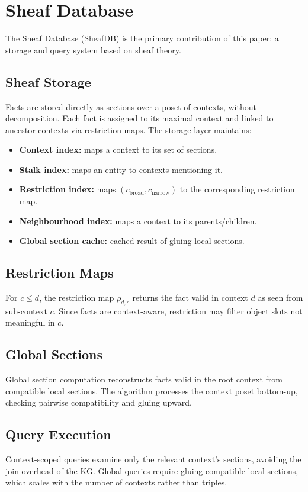 \section{Sheaf Database}
\label{sec:sheaf-database}

The Sheaf Database (SheafDB) is the primary contribution of this paper:
a storage and query system based on sheaf theory.

\subsection{Sheaf Storage}
\label{sec:sheaf:storage}

Facts are stored directly as sections over a poset of contexts, without
decomposition. Each fact is assigned to its maximal context and linked to
ancestor contexts via restriction maps. The storage layer maintains:

\begin{itemize}
    \item \textbf{Context index:} maps a context to its set of sections.
    \item \textbf{Stalk index:} maps an entity to contexts mentioning it.
    \item \textbf{Restriction index:} maps $(c_{\text{broad}}, c_{\text{narrow}})$
          to the corresponding restriction map.
    \item \textbf{Neighbourhood index:} maps a context to its parents/children.
    \item \textbf{Global section cache:} cached result of gluing local sections.
\end{itemize}

\subsection{Restriction Maps}
\label{sec:sheaf:restriction}

For $c \leq d$, the restriction map $\rho_{d,c}$ returns the fact valid
in context $d$ as seen from sub-context $c$. Since facts are context-aware,
restriction may filter object slots not meaningful in $c$.

\subsection{Global Sections}
\label{sec:sheaf:global}

Global section computation reconstructs facts valid in the root context
from compatible local sections. The algorithm processes the context poset
bottom-up, checking pairwise compatibility and gluing upward.

\subsection{Query Execution}
\label{sec:sheaf:query}

Context-scoped queries examine only the relevant context's sections,
avoiding the join overhead of the KG. Global queries require gluing
compatible local sections, which scales with the number of contexts
rather than triples.
